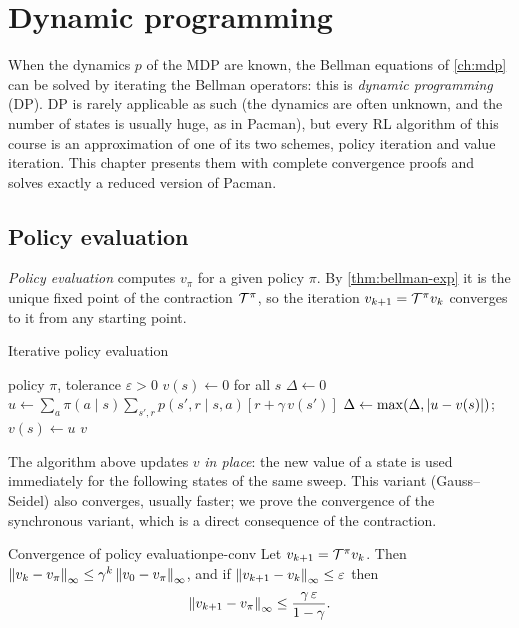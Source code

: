 \chapter{Dynamic programming}
\label{ch:dp}

When the dynamics $p$ of the MDP are known, the Bellman equations of
\cref{ch:mdp} can be solved by iterating the Bellman operators: this is
\emph{dynamic programming} (DP). DP is rarely applicable as such (the
dynamics are often unknown, and the number of states is usually huge, as in
Pacman), but every RL algorithm of this course is an approximation of one of
its two schemes, policy iteration and value iteration. This chapter
presents them with complete convergence proofs and solves exactly a
reduced version of Pacman.

\section{Policy evaluation}

\emph{Policy evaluation} computes $v_\pi$ for a given policy $\pi$. By
\cref{thm:bellman-exp} it is the unique fixed point of the contraction
$\mathcal{T}^\pi$, so the iteration $v_{k+1} = \mathcal{T}^\pi v_k$ converges to it from any
starting point.

\begin{algobox}{Iterative policy evaluation}
  \begin{algorithmic}[1]
    \Require policy $\pi$, tolerance $\varepsilon > 0$
    \State $v(s) \gets 0$ for all $s$
    \Repeat
      \State $\Delta \gets 0$
        \State $u \gets \sum_a \pi(a \mid s) \sum_{s', r} p(s', r \mid s, a)
          \left[ r + \gamma\, v(s') \right]$
        \State $\Delta \gets \max(\Delta, \left\lvert u - v(s) \right\rvert)$;\quad $v(s) \gets u$
      \EndFor
    \Until{$\Delta < \varepsilon$}
    \State \Return $v$
  \end{algorithmic}
\end{algobox}

The algorithm above updates $v$ \emph{in place}: the new value of a state is
used immediately for the following states of the same sweep. This variant
(Gauss--Seidel) also converges, usually faster; we prove the convergence of
the synchronous variant, which is a direct consequence of the contraction.

\begin{proposition}{Convergence of policy evaluation}{pe-conv}
  Let $v_{k+1} = \mathcal{T}^\pi v_k$. Then $\left\lVert v_k - v_\pi \right\rVert_\infty \leq
  \gamma^k \left\lVert v_0 - v_\pi \right\rVert_\infty$, and if $\left\lVert v_{k+1} -
  v_k \right\rVert_\infty \leq \varepsilon$ then
  \begin{equation}
    \left\lVert v_{k+1} - v_\pi \right\rVert_\infty \leq \frac{\gamma\, \varepsilon}{1 -
    \gamma}.
  \end{equation}
\end{proposition}

